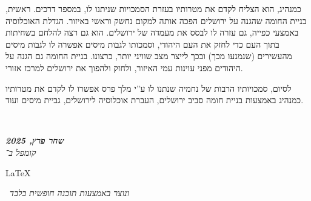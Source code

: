 \documentclass[]{article}
\newcommand\en[1] {\begin{otherlanguage}{english}#1\end{otherlanguage}}
\newcommand\ndoc  {\dotfill \\ \vfil {\begin{center}
            {\textbf{\textit{שחר פרץ, 2025}} \\
                \scriptsize \textit{קומפל ב־}\en{\LaTeX}\,\textit{ ונוצר באמצעות תוכנה חופשית בלבד}}
    \end{center}} \vfil	}
\begin{document}
\begin{enumerate}[A.]
        כמנהיג, הוא הצליח לקדם את מטרותיו בעזרת הסמכויות שניתנו לו, במספר דרכים. ראשית, בניית החומה שהגנה על ירושלים הפכה אותה למקום נחשק וראשי באיזור. הגדלת האוכלוסיה באמצעי כפייה, גם עזרה לו לבסס את מעמדה של ירושלים. הוא גם רצה להלחם בשחיתות בתוך העם כדי לחזק את העם היהודי, וסמכותו לגבות מיסים אפשרה לו לגבות מיסים מהעשירים (שנמנעו מכך) ובכך לייצר מצב שוויני יותר, כרצונו. בניית החומה גם הגנה על היהודים מפני עוינות עמי האיזור, ולחזק ולהפוך את ירושלים למרכז אזורי. 
        
        לסיום, סמכויותיו הרבות של נחמיה שנתנו לו ע''י מלך פרס אפשרו לו לקדם את מטרותיו כמנהיג באמצעות בניית חומה סביב ירושלים, העברת אוכלוסיה לירושלים, גביית מיסים ועוד. 
        
        
        
        
        
        
    \end{enumerate}
    
    \ndoc
\end{document}
